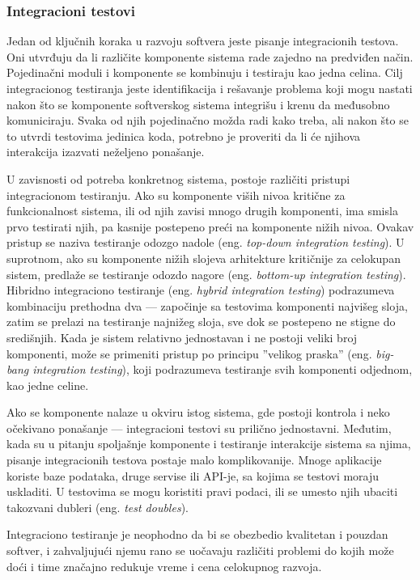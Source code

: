 \documentclass[12pt,oneside]{memoir}
\begin{document}
\subsubsection{Integracioni testovi}
\label{sec:integration}
\par Jedan od ključnih koraka u razvoju softvera jeste pisanje integracionih testova. Oni utvrđuju da li različite komponente sistema rade zajedno na predviđen način. Pojedinačni moduli i komponente se kombinuju i testiraju kao jedna celina. Cilj integracionog testiranja jeste identifikacija i rešavanje problema koji mogu nastati nakon što se komponente softverskog sistema integrišu i krenu da međusobno komuniciraju. Svaka od njih pojedinačno možda radi kako treba, ali nakon što se to utvrdi testovima jedinica koda, potrebno je proveriti da li će njihova interakcija izazvati neželjeno ponašanje. 
\par U zavisnosti od potreba konkretnog sistema, postoje različiti pristupi integracionom testiranju. Ako su komponente viših nivoa kritične za funkcionalnost sistema, ili od njih zavisi mnogo drugih komponenti, ima smisla prvo testirati njih, pa kasnije postepeno preći na komponente nižih nivoa. Ovakav pristup se naziva testiranje odozgo nadole (eng. \emph{top-down integration testing}). U suprotnom, ako su komponente nižih slojeva arhitekture kritičnije za celokupan sistem, predlaže se testiranje odozdo nagore (eng. \emph{bottom-up integration testing}). Hibridno integraciono testiranje (eng. \emph{hybrid integration testing}) podrazumeva kombinaciju prethodna dva --- započinje sa testovima komponenti najvišeg sloja, zatim se prelazi na testiranje najnižeg sloja, sve dok se postepeno ne stigne do središnjih. Kada je sistem relativno jednostavan i ne postoji veliki broj komponenti, može se primeniti pristup po principu ''velikog praska'' (eng. \emph{big-bang integration testing}), koji podrazumeva testiranje svih komponenti odjednom, kao jedne celine. 
\par Ako se komponente nalaze u okviru istog sistema, gde postoji kontrola i neko očekivano ponašanje --- integracioni testovi su prilično jednostavni. Međutim, kada su u pitanju spoljašnje komponente i testiranje interakcije sistema sa njima, pisanje integracionih testova postaje malo komplikovanije. Mnoge aplikacije koriste baze podataka, druge servise ili API-je, sa kojima se testovi moraju uskladiti. U testovima se mogu koristiti pravi podaci, ili se umesto njih ubaciti takozvani dubleri (eng. \textit{test doubles}).
\par Integraciono testiranje je neophodno da bi se obezbedio kvalitetan i pouzdan softver, i zahvaljujući njemu rano se uočavaju različiti problemi do kojih može doći i time značajno redukuje vreme i cena celokupnog razvoja. 
\end{document}
